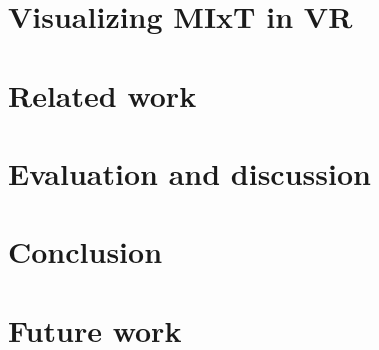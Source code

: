 \documentclass[USenglish]{uit-thesis}
\begin{document}
\chapter{Visualizing MIxT in VR}


\chapter{Related work}


\chapter{Evaluation and discussion}


\chapter{Conclusion}


\chapter{Future work}


\printbibliography

% 

\backmatter
\end{document}
